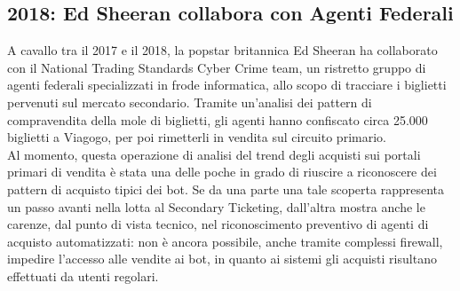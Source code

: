 \subsection{2018: Ed Sheeran collabora con Agenti Federali}
A cavallo tra il 2017 e il 2018, la popstar britannica Ed Sheeran ha collaborato con il National Trading Standards Cyber Crime team, un ristretto gruppo di agenti federali specializzati in frode informatica, allo scopo di tracciare i biglietti pervenuti sul mercato secondario. Tramite un'analisi dei pattern di compravendita della mole di biglietti, gli agenti hanno confiscato circa 25.000 biglietti a Viagogo, per poi rimetterli in vendita sul circuito primario. \\
Al momento, questa operazione di analisi del trend degli acquisti sui portali primari di vendita è stata una delle poche in grado di riuscire a riconoscere dei pattern di acquisto tipici dei bot. 
Se da una parte una tale scoperta rappresenta un passo avanti nella lotta al Secondary Ticketing, dall'altra mostra anche le carenze, dal punto di vista tecnico, nel riconoscimento preventivo di agenti di acquisto automatizzati: non è ancora possibile, anche tramite complessi firewall, impedire l'accesso alle vendite ai bot, in quanto ai sistemi gli acquisti risultano effettuati da utenti regolari. 